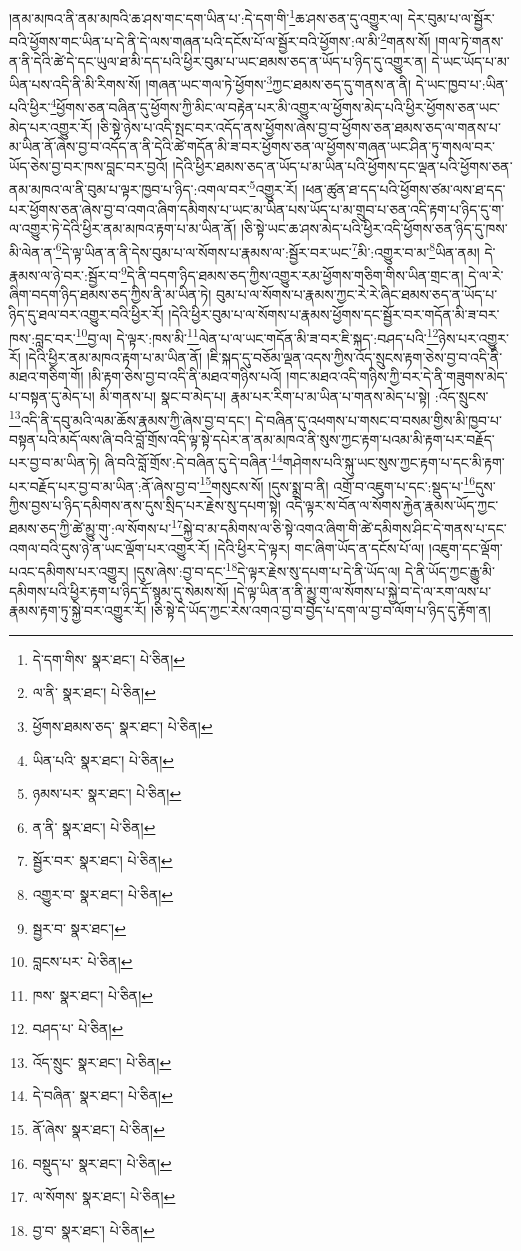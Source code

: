 །ནམ་མཁའ་ནི་ནམ་མཁའི་ཆ་ཤས་གང་དག་ཡིན་པ་:དེ་དག་གི་\footnote{དེ་དག་གིས་  སྣར་ཐང་།  པེ་ཅིན། }ཆ་ཤས་ཅན་དུ་འགྱུར་ལ། དེར་བུམ་པ་ལ་སྦྱོར་བའི་ཕྱོགས་གང་ཡིན་པ་དེ་ནི་དེ་ལས་གཞན་པའི་དངོས་པོ་ལ་སྦྱོར་བའི་ཕྱོགས་:ལ་མི་\footnote{ལ་ནི་  སྣར་ཐང་།  པེ་ཅིན། }གནས་སོ། །གལ་ཏེ་གནས་ན་ནི་དེའི་ཚེ་དེ་དང་ཡུལ་ཐ་མི་དད་པའི་ཕྱིར་བུམ་པ་ཡང་ཐམས་ཅད་ན་ཡོད་པ་ཉིད་དུ་འགྱུར་ན། དེ་ཡང་ཡོད་པ་མ་ཡིན་པས་འདི་ནི་མི་རིགས་སོ། །གཞན་ཡང་གལ་ཏེ་ཕྱོགས་\footnote{ཕྱོགས་ཐམས་ཅད་  སྣར་ཐང་།  པེ་ཅིན། }ཀྱང་ཐམས་ཅད་དུ་གནས་ན་ནི། དེ་ཡང་ཁྱབ་པ་:ཡིན་པའི་ཕྱིར་\footnote{ཡིན་པའི་  སྣར་ཐང་།  པེ་ཅིན། }ཕྱོགས་ཅན་བཞིན་དུ་ཕྱོགས་ཀྱི་མིང་ལ་བརྟེན་པར་མི་འགྱུར་ལ་ཕྱོགས་མེད་པའི་ཕྱིར་ཕྱོགས་ཅན་ཡང་མེད་པར་འགྱུར་རོ། །ཅི་སྟེ་ཉེས་པ་འདི་སྤང་བར་འདོད་ནས་ཕྱོགས་ཞེས་བྱ་བ་ཕྱོགས་ཅན་ཐམས་ཅད་ལ་གནས་པ་མ་ཡིན་ནོ་ཞེས་བྱ་བ་འདོད་ན་ནི་དེའི་ཚེ་གདོན་མི་ཟ་བར་ཕྱོགས་ཅན་ལ་ཕྱོགས་གཞན་ཡང་ཤིན་ཏུ་གསལ་བར་ཡོད་ཅེས་བྱ་བར་ཁས་བླང་བར་བྱའོ། །དེའི་ཕྱིར་ཐམས་ཅད་ན་ཡོད་པ་མ་ཡིན་པའི་ཕྱོགས་དང་ལྡན་པའི་ཕྱོགས་ཅན་ནམ་མཁའ་ལ་ནི་བུམ་པ་ལྟར་ཁྱབ་པ་ཉིད་:འགལ་བར་\footnote{ཉམས་པར་  སྣར་ཐང་།  པེ་ཅིན། }འགྱུར་རོ། །ཕན་ཚུན་ཐ་དད་པའི་ཕྱོགས་ཙམ་ལས་ཐ་དད་པར་ཕྱོགས་ཅན་ཞེས་བྱ་བ་འགའ་ཞིག་དམིགས་པ་ཡང་མ་ཡིན་པས་ཡོད་པ་མ་གྲུབ་པ་ཅན་འདི་རྟག་པ་ཉིད་དུ་ག་ལ་འགྱུར་ཏེ་དེའི་ཕྱིར་ནམ་མཁའ་རྟག་པ་མ་ཡིན་ནོ། །ཅི་སྟེ་ཡང་ཆ་ཤས་མེད་པའི་ཕྱིར་འདི་ཕྱོགས་ཅན་ཉིད་དུ་ཁས་མི་ལེན་ན་\footnote{ན་ནི་  སྣར་ཐང་།  པེ་ཅིན། }དེ་ལྟ་ཡིན་ན་ནི་དེས་བུམ་པ་ལ་སོགས་པ་རྣམས་ལ་:སྦྱོར་བར་ཡང་\footnote{སྦྱོར་བར་  སྣར་ཐང་།  པེ་ཅིན། }མི་:འགྱུར་བ་མ་\footnote{འགྱུར་བ་  སྣར་ཐང་།  པེ་ཅིན། }ཡིན་ནམ། དེ་རྣམས་ལ་ཉེ་བར་:སྦྱོར་བ་\footnote{སྦྱར་བ་  སྣར་ཐང་། }དེ་ནི་བདག་ཉིད་ཐམས་ཅད་ཀྱིས་འགྱུར་རམ་ཕྱོགས་གཅིག་གིས་ཡིན་གྲང་ན། དེ་ལ་རེ་ཞིག་བདག་ཉིད་ཐམས་ཅད་ཀྱིས་ནི་མ་ཡིན་ཏེ། བུམ་པ་ལ་སོགས་པ་རྣམས་ཀྱང་རེ་རེ་ཞིང་ཐམས་ཅད་ན་ཡོད་པ་ཉིད་དུ་ཐལ་བར་འགྱུར་བའི་ཕྱིར་རོ། །དེའི་ཕྱིར་བུམ་པ་ལ་སོགས་པ་རྣམས་ཕྱོགས་དང་སྦྱོར་བར་གདོན་མི་ཟ་བར་ཁས་:བླང་བར་\footnote{བླངས་པར་  པེ་ཅིན། }བྱ་ལ། དེ་ལྟར་:ཁས་མི་\footnote{ཁས་  སྣར་ཐང་།  པེ་ཅིན། }ལེན་པ་ལ་ཡང་གདོན་མི་ཟ་བར་ཇི་སྐད་:བཤད་པའི་\footnote{བཤད་པ་  པེ་ཅིན། }ཉེས་པར་འགྱུར་རོ། །དེའི་ཕྱིར་ནམ་མཁའ་རྟག་པ་མ་ཡིན་ནོ། །ཇི་སྐད་དུ་བཅོམ་ལྡན་འདས་ཀྱིས་འོད་སྲུངས་རྟག་ཅེས་བྱ་བ་འདི་ནི་མཐའ་གཅིག་གོ། །མི་རྟག་ཅེས་བྱ་བ་འདི་ནི་མཐའ་གཉིས་པའོ། །གང་མཐའ་འདི་གཉིས་ཀྱི་བར་དེ་ནི་གཟུགས་མེད་པ་བསྟན་དུ་མེད་པ། མི་གནས་པ། སྣང་བ་མེད་པ། རྣམ་པར་རིག་པ་མ་ཡིན་པ་གནས་མེད་པ་སྟེ། :འོད་སྲུངས་\footnote{འོད་སྲུང་  སྣར་ཐང་།  པེ་ཅིན། }འདི་ནི་དབུ་མའི་ལམ་ཆོས་རྣམས་ཀྱི་ཞེས་བྱ་བ་དང་། དེ་བཞིན་དུ་འཕགས་པ་གསང་བ་བསམ་གྱིས་མི་ཁྱབ་པ་བསྟན་པའི་མདོ་ལས་ཞི་བའི་བློ་གྲོས་འདི་ལྟ་སྟེ་དཔེར་ན་ནམ་མཁའ་ནི་སུས་ཀྱང་རྟག་པའམ་མི་རྟག་པར་བརྗོད་པར་བྱ་བ་མ་ཡིན་ཏེ། ཞི་བའི་བློ་གྲོས་:དེ་བཞིན་དུ་དེ་བཞིན་\footnote{དེ་བཞིན་  སྣར་ཐང་།  པེ་ཅིན། }གཤེགས་པའི་སྐུ་ཡང་སུས་ཀྱང་རྟག་པ་དང་མི་རྟག་པར་བརྗོད་པར་བྱ་བ་མ་ཡིན་:ནོ་ཞེས་བྱ་བ་\footnote{ནོ་ཞེས་  སྣར་ཐང་།  པེ་ཅིན། }གསུངས་སོ། །དུས་སྨྲ་བ་ནི། འགྲོ་བ་འཇུག་པ་དང་:སྡུད་པ་\footnote{བསྡུད་པ་  སྣར་ཐང་།  པེ་ཅིན། }དུས་ཀྱིས་བྱས་པ་ཉིད་དམིགས་ནས་དུས་སྲིད་པར་རྗེས་སུ་དཔག་སྟེ། འདི་ལྟར་ས་བོན་ལ་སོགས་རྐྱེན་རྣམས་ཡོད་ཀྱང་ཐམས་ཅད་ཀྱི་ཚེ་མྱུ་གུ་:ལ་སོགས་པ་\footnote{ལ་སོགས་  སྣར་ཐང་།  པེ་ཅིན། }སྐྱེ་བ་མ་དམིགས་ལ་ཅི་སྟེ་འགའ་ཞིག་གི་ཚེ་དམིགས་ཤིང་དེ་གནས་པ་དང་འགལ་བའི་དུས་ཉེ་ན་ཡང་ལྡོག་པར་འགྱུར་རོ། །དེའི་ཕྱིར་དེ་ལྟར། གང་ཞིག་ཡོད་ན་དངོས་པོ་ལ། །འཇུག་དང་ལྡོག་པའང་དམིགས་པར་འགྱུར། །དུས་ཞེས་:བྱ་བ་དང་\footnote{བྱ་བ་  སྣར་ཐང་།  པེ་ཅིན། }དེ་ལྟར་རྗེས་སུ་དཔག་པ་དེ་ནི་ཡོད་ལ། དེ་ནི་ཡོད་ཀྱང་རྒྱུ་མི་དམིགས་པའི་ཕྱིར་རྟག་པ་ཉིད་དོ་སྙམ་དུ་སེམས་སོ། །དེ་ལྟ་ཡིན་ན་ནི་མྱུ་གུ་ལ་སོགས་པ་སྐྱེ་བ་དེ་ལ་རག་ལས་པ་རྣམས་རྟག་ཏུ་སྐྱེ་བར་འགྱུར་རོ། །ཅི་སྟེ་དེ་ཡོད་ཀྱང་རེས་འགའ་བྱ་བ་བྱེད་པ་དག་ལ་བྱ་བ་ལོག་པ་ཉིད་དུ་རྟོག་ན། 